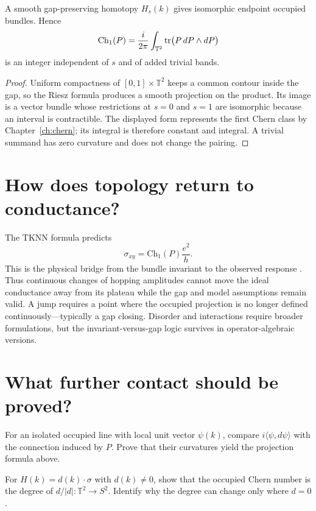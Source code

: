 \begin{theorem}
A smooth gap-preserving homotopy $H_s(k)$ gives isomorphic endpoint occupied
bundles.  Hence
\[
\mathrm{Ch}_1(P)
=\frac{i}{2\pi}\int_{\mathbb T^2}
\operatorname{tr}\bigl(P\,dP\wedge dP\bigr)
\]
is an integer independent of $s$ and of added trivial bands.
\end{theorem}

\begin{proof}
Uniform compactness of $[0,1]\times\mathbb T^2$ keeps a common contour inside
the gap, so the Riesz formula produces a smooth projection on the product.
Its image is a vector bundle whose restrictions at $s=0$ and $s=1$ are
isomorphic because an interval is contractible.  The displayed form
represents the first Chern class by Chapter~\ref{ch:chern}; its integral is
therefore constant and integral.  A trivial summand has zero curvature and
does not change the pairing.
\end{proof}

\section{How does topology return to conductance?}

The TKNN formula predicts
\[
\sigma_{xy}=\mathrm{Ch}_1(P)\frac{e^2}{h}.
\]
This is the physical bridge from the bundle invariant to the observed
response \cite{tknn,von-klitzing}.
Thus continuous changes of hopping amplitudes cannot move the ideal
conductance away from its plateau while the gap and model assumptions remain
valid.  A jump requires a point where the occupied projection is no longer
defined continuously---typically a gap closing.  Disorder and interactions
require broader formulations, but the invariant-versus-gap logic survives in
operator-algebraic versions.

\section{What further contact should be proved?}

\begin{exercise}
For an isolated occupied line with local unit vector $\psi(k)$, compare
$i\langle\psi,d\psi\rangle$ with the connection induced by $P$.  Prove that
their curvatures yield the projection formula above.
\end{exercise}

\begin{exercise}
For $H(k)=d(k)\cdot\sigma$ with $d(k)\ne0$, show that the occupied Chern
number is the degree of $d/|d|:\mathbb T^2\to S^2$.  Identify why the degree
can change only where $d=0$.
\end{exercise}


